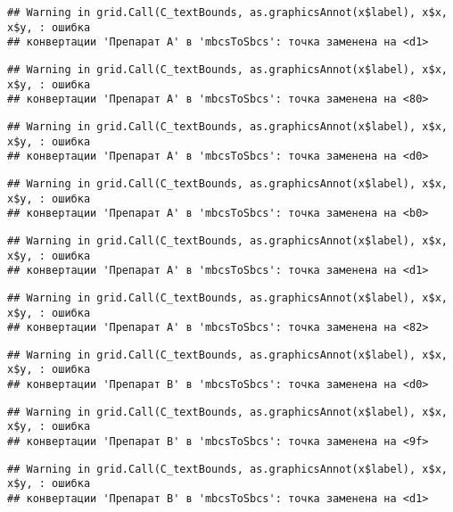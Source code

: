 \documentclass[
]{article}
\begin{document}
\begin{verbatim}
## Warning in grid.Call(C_textBounds, as.graphicsAnnot(x$label), x$x, x$y, : ошибка
## конвертации 'Препарат A' в 'mbcsToSbcs': точка заменена на <d1>
\end{verbatim}

\begin{verbatim}
## Warning in grid.Call(C_textBounds, as.graphicsAnnot(x$label), x$x, x$y, : ошибка
## конвертации 'Препарат A' в 'mbcsToSbcs': точка заменена на <80>
\end{verbatim}

\begin{verbatim}
## Warning in grid.Call(C_textBounds, as.graphicsAnnot(x$label), x$x, x$y, : ошибка
## конвертации 'Препарат A' в 'mbcsToSbcs': точка заменена на <d0>
\end{verbatim}

\begin{verbatim}
## Warning in grid.Call(C_textBounds, as.graphicsAnnot(x$label), x$x, x$y, : ошибка
## конвертации 'Препарат A' в 'mbcsToSbcs': точка заменена на <b0>
\end{verbatim}

\begin{verbatim}
## Warning in grid.Call(C_textBounds, as.graphicsAnnot(x$label), x$x, x$y, : ошибка
## конвертации 'Препарат A' в 'mbcsToSbcs': точка заменена на <d1>
\end{verbatim}

\begin{verbatim}
## Warning in grid.Call(C_textBounds, as.graphicsAnnot(x$label), x$x, x$y, : ошибка
## конвертации 'Препарат A' в 'mbcsToSbcs': точка заменена на <82>
\end{verbatim}

\begin{verbatim}
## Warning in grid.Call(C_textBounds, as.graphicsAnnot(x$label), x$x, x$y, : ошибка
## конвертации 'Препарат B' в 'mbcsToSbcs': точка заменена на <d0>
\end{verbatim}

\begin{verbatim}
## Warning in grid.Call(C_textBounds, as.graphicsAnnot(x$label), x$x, x$y, : ошибка
## конвертации 'Препарат B' в 'mbcsToSbcs': точка заменена на <9f>
\end{verbatim}

\begin{verbatim}
## Warning in grid.Call(C_textBounds, as.graphicsAnnot(x$label), x$x, x$y, : ошибка
## конвертации 'Препарат B' в 'mbcsToSbcs': точка заменена на <d1>
\end{verbatim}
\end{document}
